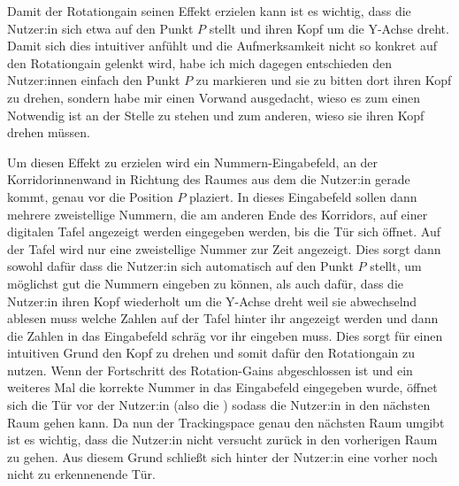 Damit der Rotationgain seinen Effekt erzielen kann ist es wichtig, dass die Nutzer:in sich etwa auf den Punkt $P$ stellt und ihren Kopf um die Y-Achse dreht.
Damit sich dies intuitiver anfühlt und die Aufmerksamkeit nicht so konkret auf den Rotationgain gelenkt wird, habe ich mich dagegen entschieden den Nutzer:innen einfach den Punkt $P$ zu markieren und sie zu bitten dort ihren Kopf zu drehen, sondern habe mir einen Vorwand ausgedacht, wieso es zum einen Notwendig ist an der Stelle zu stehen und zum anderen, wieso sie ihren Kopf drehen müssen.

Um diesen Effekt zu erzielen wird ein Nummern-Eingabefeld, an der Korridorinnenwand in Richtung des Raumes aus dem die Nutzer:in gerade kommt, genau vor die Position $P$ plaziert. In dieses Eingabefeld sollen dann mehrere zweistellige Nummern, die am anderen Ende des Korridors, auf einer digitalen Tafel angezeigt werden eingegeben werden, bis die Tür sich öffnet. Auf der Tafel wird nur eine zweistellige Nummer zur Zeit angezeigt.
Dies sorgt dann sowohl dafür dass die Nutzer:in sich automatisch auf den Punkt $P$ stellt, um möglichst gut die Nummern eingeben zu können, als auch dafür, dass die Nutzer:in ihren Kopf wiederholt um die Y-Achse dreht weil sie abwechselnd ablesen muss welche Zahlen auf der Tafel hinter ihr angezeigt werden und dann die Zahlen in das Eingabefeld schräg vor ihr eingeben muss. Dies sorgt für einen intuitiven Grund den Kopf zu drehen und somit dafür den Rotationgain zu nutzen. Wenn der Fortschritt des Rotation-Gains abgeschlossen ist und ein weiteres Mal die korrekte Nummer in das Eingabefeld eingegeben wurde, öffnet sich die Tür vor der Nutzer:in (also die ) sodass die Nutzer:in in den nächsten Raum gehen kann. Da nun der Trackingspace genau den nächsten Raum umgibt ist es wichtig, dass die Nutzer:in nicht versucht zurück in den vorherigen Raum zu gehen. Aus diesem Grund schließt sich hinter der Nutzer:in eine vorher noch nicht zu erkennenende Tür.

